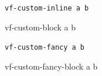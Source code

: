 \documentclass{article}
\begin{document}
\verb*|vf-custom-inline a b|
\begin{verbatim*}
vf-custom-block a b
\end{verbatim*}
\Verb*|vf-custom-fancy a b|
\begin{Verbatim*}
vf-custom-fancy-block a b
\end{Verbatim*}
\end{document}
